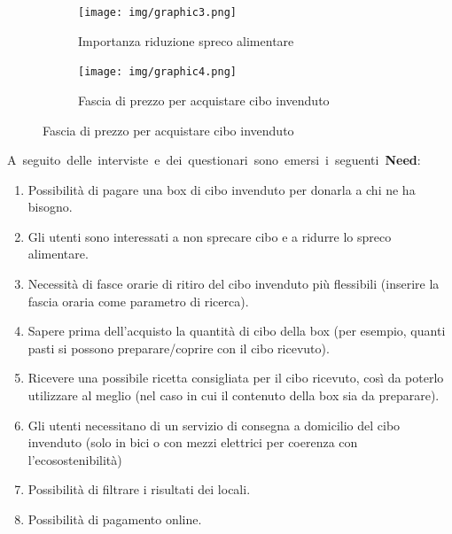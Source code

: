 \documentclass{article}
\begin{document}
\begin{figure}[H]
    \centering
    \begin{subfigure}{0.40\textwidth}
        \centering
        \texttt{[image: img/graphic3.png]}
        \caption{Importanza riduzione spreco alimentare}
    \end{subfigure}
    \hfill
    \begin{subfigure}{0.40\textwidth}
        \centering
        \texttt{[image: img/graphic4.png]}
        \caption{Fascia di prezzo per acquistare cibo invenduto}
    \end{subfigure}
\end{figure}

\hbox{A seguito delle interviste e dei questionari sono emersi i seguenti \textbf{Need}:}
\begin{enumerate}[label=\textbf{Need-\arabic*}]
    \item Possibilità di pagare una box di cibo invenduto per donarla a chi ne ha bisogno. \label{need1}
    \item Gli utenti sono interessati a non sprecare cibo e a ridurre lo spreco alimentare. \label{need2}
    \item Necessità di fasce orarie di ritiro del cibo invenduto più flessibili (inserire la fascia oraria come parametro di ricerca). \label{need3}
    \item Sapere prima dell'acquisto la quantità di cibo della box (per esempio, quanti pasti si possono preparare/coprire con il cibo ricevuto). \label{need4}
    \item Ricevere una possibile ricetta consigliata per il cibo ricevuto, così da poterlo utilizzare al meglio (nel caso in cui il contenuto della box sia da preparare). \label{need5}
    \item Gli utenti necessitano di un servizio di consegna a domicilio del cibo invenduto (solo in bici o con mezzi elettrici per coerenza con l'ecosostenibilità) \label{need6}
    \item Possibilità di filtrare i risultati dei locali. \label{need7}
    \item Possibilità di pagamento online. \label{need8}
\end{enumerate}
\end{document}
